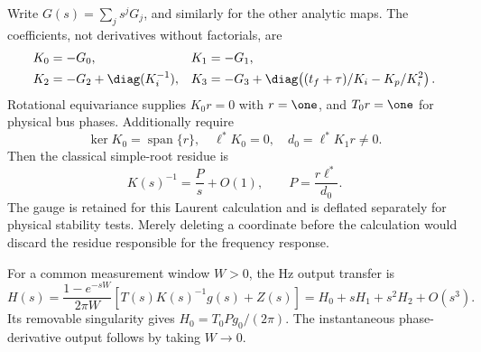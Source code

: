 Write $G(s)=\sum_j s^jG_j$, and similarly for the other analytic maps.
The coefficients, not derivatives without factorials, are
\begin{align}
 K_0&=-G_0,& K_1&=-G_1,\\
 K_2&=-G_2+\diag(K_i^{-1}),&
 K_3&=-G_3+\diag\!\left((t_f+\tau)/K_i-K_p/K_i^2\right).
 \label{eq:momentKcoeff}
\end{align}
Rotational equivariance supplies $K_0r=0$ with $r=\one$, and $T_0r=\one$
for physical bus phases. Additionally require
\[
 \ker K_0=\operatorname{span}\{r\},\quad
 \ell^*K_0=0,\quad d_0=\ell^*K_1r\ne0.
\]
Then the classical simple-root residue is
\begin{equation}
 K(s)^{-1}=\frac{P}{s}+O(1),\qquad
 P=\frac{r\ell^*}{d_0}.
 \label{eq:momentresidue}
\end{equation}
The gauge is retained for this Laurent calculation and is deflated separately
for physical stability tests. Merely deleting a coordinate before the
calculation would discard the residue responsible for the frequency response.

For a common measurement window $W>0$, the Hz output transfer is
\begin{equation}
 H(s)=\frac{1-e^{-sW}}{2\pi W}
 \left[T(s)K(s)^{-1}g(s)+Z(s)\right]
      =H_0+sH_1+s^2H_2+O(s^3).
 \label{eq:momentfreq}
\end{equation}
Its removable singularity gives $H_0=T_0Pg_0/(2\pi)$. The instantaneous
phase-derivative output follows by taking $W\to0$.


